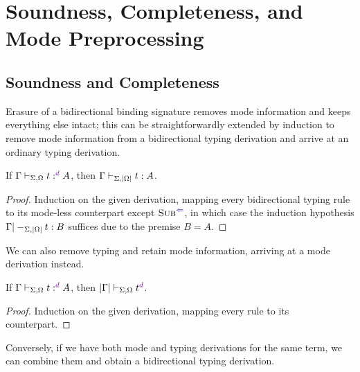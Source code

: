 
\section{Soundness, Completeness, and Mode Preprocessing}\label{sec:pre-synthesis}

\subsection{Soundness and Completeness}
\label{sec:soundness-and-completeness}


Erasure of a bidirectional binding signature removes mode information and keeps everything else intact; this can be straightforwardly extended by induction to remove mode information from a bidirectional typing derivation and arrive at an ordinary typing derivation.

\begin{lemma}[Soundness]\label{thm:term-soundness}
If\/ $\Gamma \vdash_{\Sigma, \Omega} t :^\dir{d} A$, then $\Gamma \vdash_{\Sigma, \left|\Omega\right|} t : A$.
\end{lemma}

\begin{proof}
Induction on the given derivation, mapping every bidirectional typing rule to its mode-less counterpart except $\ChkRule{Sub}$, in which case the induction hypothesis $\Gamma |-_{\Sigma,\left|\Omega\right|} t : B$ suffices due to the premise $B = A$.
\end{proof}

We can also remove typing and retain mode information, arriving at a mode derivation instead.

\begin{proposition}\label{thm:typing-removal}
If\/ $\Gamma \vdash_{\Sigma, \Omega} t :^\dir{d} A$, then $\erase\Gamma \vdash_{\Sigma, \Omega} t^\dir{d}$.
\end{proposition}

\begin{proof}
Induction on the given derivation, mapping every rule to its counterpart.
\end{proof}

Conversely, if we have both mode and typing derivations for the same term, we can combine them and obtain a bidirectional typing derivation.

